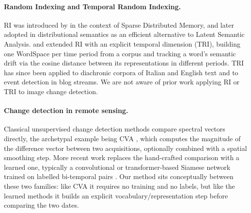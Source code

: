 \documentclass[11pt]{article}
\begin{document}
\paragraph{Random Indexing and Temporal Random Indexing.} RI was introduced by \citet{kanerva1988} in the context of Sparse Distributed Memory, and later adopted in distributional semantics as an efficient alternative to Latent Semantic Analysis. \citet{basile2014tri} and \citet{caputo2015tri} extended RI with an explicit temporal dimension (TRI), building one WordSpace per time period from a corpus and tracking a word's semantic drift via the cosine distance between its representations in different periods. TRI has since been applied to diachronic corpora of Italian and English text and to event detection in blog streams. We are not aware of prior work applying RI or TRI to image change detection.

\paragraph{Change detection in remote sensing.} Classical unsupervised change detection methods compare spectral vectors directly, the archetypal example being CVA \citep{malila1980}, which computes the magnitude of the difference vector between two acquisitions, optionally combined with a spatial smoothing step. More recent work replaces the hand-crafted comparison with a learned one, typically a convolutional or transformer-based Siamese network trained on labelled bi-temporal pairs \citep{wang2019getnet}. Our method sits conceptually between these two families: like CVA it requires no training and no labels, but like the learned methods it builds an explicit vocabulary/representation step before comparing the two dates.
\end{document}
